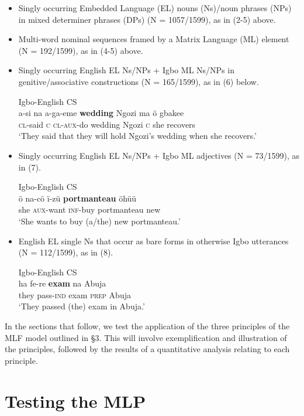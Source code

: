 \documentclass[output=paper]{langsci/langscibook}
\begin{document}
\begin{itemize}
 \item Singly occurring Embedded Language (EL) nouns (Ns)/noun phrases (NPs) in mixed determiner phrases (DPs) (N = 1057/1599), as in (2-5) above. 

 \item Multi-word nominal sequences framed by a Matrix Language (ML) element (N = 192/1599), as in (4-5) above.

 \item Singly occurring English EL Ns/NPs + Igbo ML Ns/NPs in genitive/associative constructions (N = 165/1599), as in (6) below.
 
\ea
{Igbo-English \textsc{CS}}\\
\gll a-si    na  a-ga-eme   \textbf{wedding  }Ngozi  ma   ö  gbakee\\
     \textsc{cl}{}-said  \textsc{c  cl-aux}{}-do  wedding  Ngozi  \textsc{c}\textsubscript{  }she  recovers\\
\glt ‘They said that they will hold Ngozi’s wedding when she recovers.’
\z

\item Singly occurring English EL Ns/NPs + Igbo ML adjectives (N = 73/1599), as in (7).
 

\ea
{Igbo-English \textsc{CS}}\\
\gll ö  na-cö    ï-zü    \textbf{portmanteau  }öhüü \\
     she  \textsc{aux}{}-want  \textsc{inf}{}-buy  portmanteau  new\\
\glt ‘She wants to buy (a/the) new portmanteau.’
\z
\item English EL single Ns that occur as bare forms in otherwise Igbo utterances (N = 112/1599), as in (8).


\ea
{Igbo-English \textsc{CS}}\\
\gll ha    fe-re    \textbf{exam}  na   Abuja\\
     they  pass-\textsc{ind}\textsubscript{  }exam  \textsc{prep}  Abuja \\
\glt ‘They passed (the) exam in Abuja.’
\z

\end{itemize}

In the sections that follow, we test the application of the three principles of the MLF model outlined in §3. This will involve exemplification and illustration of the principles, followed by the results of a quantitative analysis relating to each principle. 

\section{Testing the MLP }
\end{document}
